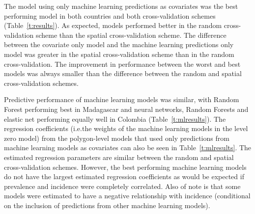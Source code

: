 \documentclass[11pt]{article}
\begin{document}


The model using only machine learning predictions as covariates was the best performing model in both countries and both cross-validation schemes (Table~\ref{t:results}).
As expected, models performed better in the random cross-validation scheme than the spatial cross-validation scheme.
The difference between the covariate only model and the machine learning predictions only model was greater in the spatial cross-validation scheme than in the random cross-validation.
The improvement in performance between the worst and best models was always smaller than the difference between the random and spatial cross-validation schemes.


Predictive performance of machine learning models was similar, with Random Forest performing best in Madagascar and neural networks, Random Forests and elastic net performing equally well in Colombia (Table~\ref{t:mlresults}).
The regression coefficients (i.e.\thinspace the weights of the machine learning models in the level zero model) from the polygon-level models that used only predictions from machine learning models as covariates can also be seen in Table~\ref{t:mlresults}.
The estimated regression parameters are similar between the random and spatial cross-validation schemes.
However, the best performing machine learning models do not have the largest estimated regression coefficients as would be expected if prevalence and incidence were completely correlated.
Also of note is that some models were estimated to have a negative relationship with incidence (conditional on the inclusion of predictions from other machine learning models).
\end{document}
